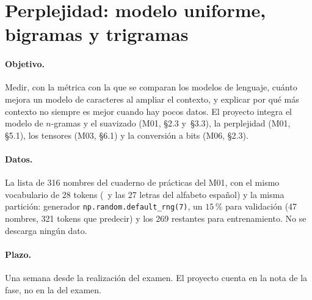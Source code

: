 
\section*{Perplejidad: modelo uniforme, bigramas y trigramas}

\paragraph{Objetivo.} Medir, con la métrica con la que se comparan los modelos de lenguaje, cuánto mejora un modelo de caracteres al ampliar el contexto, y explicar por qué más contexto no siempre es mejor cuando hay pocos datos. El proyecto integra el modelo de $n$-gramas y el suavizado (M01, §2.3 y~§3.3), la perplejidad (M01, §5.1), los tensores (M03, §6.1) y la conversión a bits (M06, §2.3).

\paragraph{Datos.} La lista de 316 nombres del cuaderno de prácticas del M01, con el mismo vocabulario de 28 tokens (\fin\ y las 27 letras del alfabeto español) y la misma partición: generador \texttt{np.random.default\_rng(7)}, un $15\,\%$ para validación (47 nombres, 321 tokens que predecir) y los 269 restantes para entrenamiento. No se descarga ningún dato.

\paragraph{Plazo.} Una semana desde la realización del examen. El proyecto cuenta en la nota de la fase, no en la del examen.

\begin{figure}[h]
\centering
{}
\par{}
\end{figure}

